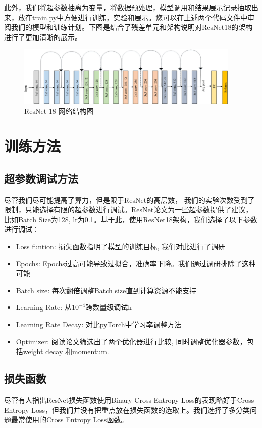 \documentclass[hyperref, UTF8, 12pt]{article}
\theoremstyle{definition}
\begin{document}
\indent
此外，我们将超参数抽离为变量，将数据预处理，模型调用和结果展示记录抽取出来，放在train.py中方便进行训练，实验和展示。您可以在上述两个代码文件中审阅我们的模型和训练计划。下图是结合了残差单元和架构说明对ResNet18的架构进行了更加清晰的展示。
\begin{figure}[h] %
	\centering %
	\includegraphics[width=0.95\textwidth]{resnet18.png} %
	\caption{ResNet-18 网络结构图} %
	\label{Fig.resnet3} %
\end{figure}


\section{训练方法}
\subsection{超参数调试方法}
尽管我们尽可能提高了算力，但是限于ResNet的高层数， 我们的实验次数受到了限制，只能选择有限的超参数进行调试。ResNet论文\cite{he2015deep}为一些超参数提供了建议，比如Batch Size为128, lr为0.1。基于此，使用ResNet18架构，我们选择了以下参数进行调试：
\begin{itemize}
	\item Loss funtion: 损失函数指明了模型的训练目标, 我们对此进行了调研
	\item Epochs: Epochs过高可能导致过拟合，准确率下降。我们通过调研排除了这种可能
	\item Batch size: 每次翻倍调整Batch size直到计算资源不能支持
	\item Learning Rate: 从$10 ^ {-4}$跨数量级调试lr
	\item Learning Rate Decay: 对比pyTorch中学习率调整方法
	\item Optimizer: 阅读论文筛选出了两个优化器进行比较, 同时调整优化器参数，包括weight decay 和momentum.
\end{itemize}

\subsection {损失函数}
尽管有人指出\cite{beyer2020imagenet}ResNet损失函数使用Binary Cross Entropy Loss的表现略好于Cross Entropy Loss，但我们并没有把重点放在损失函数的选取上。我们选择了多分类问题最常使用的Cross Entropy Loss函数。
\end{document}
